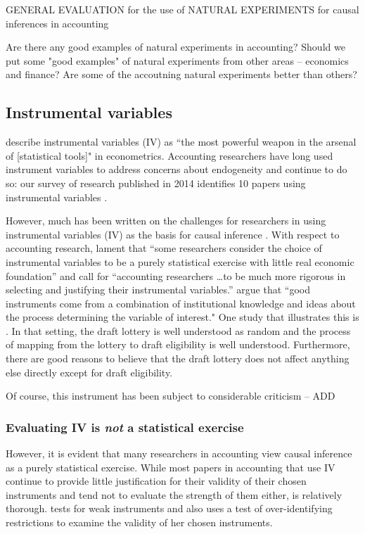 \documentclass[11pt]{amsart}
\begin{document}
GENERAL EVALUATION for the use of NATURAL EXPERIMENTS for causal inferences in accounting 

Are there any good examples of natural experiments in accounting?  Should we put some "good examples" of natural experiments from other areas -- economics and finance?  Are some of the accoutning natural experiments better than others?

\subsection{Instrumental variables}
\citet[p.114]{Angrist:2008vk} describe instrumental variables (IV) as ``the most powerful weapon in the arsenal of [statistical tools]" in econometrics. 
Accounting researchers have long used instrument variables to address concerns about endogeneity \citep{Larcker:2010fq} and continue to do so: our survey of research published in 2014 identifies 10 papers using instrumental variables \citep{Cannon:2014im,Cohen:2014jl,Kim:2014fm,Vermeer:2014bs,Fox:2014io,Guedhami:2013cj,Houston:2014hv,deFranco:2014ct,Erkens:2014hj,Correia:2014fp}. 

However, much has been written on the challenges for researchers in using instrumental variables (IV) as the basis for causal inference \citep[e.g.,][]{Roberts:2013cz}. 
With respect to accounting research, \citet{Larcker:2010fq} lament that ``some researchers consider the choice of instrumental variables to be a purely statistical exercise with little real economic foundation'' and call for 
``accounting researchers \dots to be much more rigorous in selecting and justifying their instrumental variables.'' 
\citet[p.117]{Angrist:2008vk} argue that ``good instruments come from a combination of institutional knowledge and ideas about the process determining the variable of interest."
One study that illustrates this is \cite{Angrist:2008vk}.
In that setting, the draft lottery is well understood as random and the process of mapping from the lottery to draft eligibility is well understood.
Furthermore, there are good reasons to believe that the draft lottery does not affect anything else directly except for draft eligibility.

Of course, this instrument has been subject to considerable criticism -- ADD

\subsubsection{Evaluating IV is \emph{not} a statistical exercise}
However, it is evident that many researchers in accounting view causal inference as a purely statistical exercise.
While most papers in accounting that use IV continue to provide little justification for their validity of their chosen instruments and tend not to evaluate the strength of them either, \citet{Correia:2014fp} is relatively thorough. 
\citet{Correia:2014fp} tests for weak instruments and also uses a test of over-identifying restrictions to examine the validity of her chosen instruments. 
\end{document}
